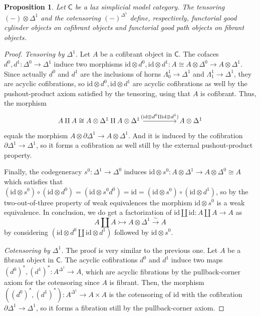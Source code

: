 \documentclass{proc-l}
\theoremstyle{plain}
\newtheorem{proposition}[{theorem}]{Proposition}
\theoremstyle{definition}
\theoremstyle{remark}
\begin{document}
\begin{proposition}%
\label{Proposition:A.13}\label{prop: goodpath}
Let $\mathsf{C}$ be a lax simplicial model category. The tensoring $(-)\otimes\Delta^1$ and the cotensoring $(-)^{\Delta^1}$ define, respectively, functorial good cylinder objects on cofibrant objects and functorial good path objects on fibrant objects.

\end{proposition}
\begin{proof}
\textit{Tensoring by $\Delta^1$.}
Let $A$ be a cofibrant object in $\mathsf{C}$. The cofaces $d^0,d^1:\Delta^0\rightarrow\Delta^1$ induce two morphisms $\mathrm{id}\otimes d^0,\mathrm{id}\otimes d^1:A \cong A \otimes \Delta^0\rightarrow A\otimes\Delta^1$. Since actually $d^0$ and $d^1$ are the inclusions of horns $\Lambda_0^1\rightarrow\Delta^1$ and $\Lambda_1^1\rightarrow\Delta^1$, they are acyclic cofibrations, so $\mathrm{id}\otimes d^0,\mathrm{id}\otimes d^1$ are acyclic cofibrations as well by the pushout-product axiom satisfied by the tensoring, using that $A$ is cofibrant. Thus, the morphism
\[
\begin{tikzcd}
A\amalg A \cong  A\otimes\Delta^1 \amalg A\otimes\Delta^1 \arrow[rr,"(\mathrm{id} \otimes d^0 \amalg \mathrm{id} \otimes d^1)"]
&
&A\otimes\Delta^1
\end{tikzcd}
\]
equals the morphism $A\otimes\partial\Delta^1\rightarrow A\otimes\Delta^1$. And it is induced by the cofibration $\partial\Delta^1\rightarrow\Delta^1$, so it forms a cofibration as well still by the external pushout-product property.

Finally, the codegeneracy $s^0:\Delta^1\rightarrow\Delta^0$ induces $\mathrm{id} \otimes s^0:A\otimes\Delta^1\rightarrow A\otimes\Delta^0 \cong A$ which satisfies that $(\mathrm{id} \otimes s^0)\circ (\mathrm{id} \otimes d^0) = (\mathrm{id}\otimes s^0d^0)= \mathrm{id} = (\mathrm{id} \otimes s^0)\circ (\mathrm{id} \otimes d^1)$, so by the two-out-of-three property of weak equivalences the morphism $\mathrm{id} \otimes s^0$ is a weak equivalence. In conclusion, we do get a factorization of $\mathrm{id} \amalg \mathrm{id}: A\amalg A\rightarrow A$ as
\[
A \amalg A \rightarrowtail A\otimes\Delta^1\stackrel{\sim}{\rightarrow} A
\]
by considering $(\mathrm{id} \otimes d^0 \amalg \mathrm{id} \otimes d^1)$ followed by $\mathrm{id} \otimes s^0$.

\textit{Cotensoring by $\Delta^1$.} The proof is very similar to the previous one. Let $A$ be a fibrant object in $\mathsf{C}$. The acyclic cofibrations $d^0$ and $d^1$ induce two maps $(d^0)^*,(d^1)^*:A^{\Delta^1}\rightarrow A$, which are acyclic fibrations by the pullback-corner axiom for the cotensoring since $A$ is fibrant. Then, the morphism $((d^0)^*,(d^1)^*): A^{\Delta^1}\rightarrow A\times A$ is the cotensoring of $\mathrm{id}$ with the cofibration $\partial\Delta^1\rightarrow \Delta^1$, so it forms a fibration still  by the pullback-corner axiom.


\end{proof}
\end{document}
